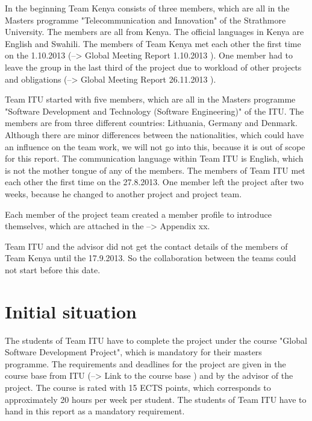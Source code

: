 In the beginning Team Kenya consists of three members, which are all in the Masters programme "Telecommunication and Innovation" of the Strathmore University. The members are all from Kenya. The official languages in Kenya are English and Swahili. The members of Team Kenya met each other the first time on the 1.10.2013 (--> Global Meeting Report 1.10.2013 ). One member had to leave the group in the last third of the project due to workload of other projects and obligations (--> Global Meeting Report 26.11.2013 ).

Team ITU started with five members, which are all in the Masters programme "Software Development and Technology (Software Engineering)" of the ITU. The members are from three different countries: Lithuania, Germany and Denmark. Although there are minor differences between the nationalities, which could have an influence on the team work, we will not go into this, because it is out of scope for this report. The communication language within Team ITU is English, which is not the mother tongue of any of the members. The members of Team ITU met each other the first time on the 27.8.2013. One member left the project after two weeks, because he changed to another project and project team.

Each member of the project team created a member profile to introduce themselves, which are attached in the --> Appendix xx.

Team ITU and the advisor did not get the contact details of the members of Team Kenya until the 17.9.2013. So the collaboration between the teams could not start before this date.


\section{Initial situation}



The students of Team ITU have to complete the project under the course "Global Software Development Project", which is mandatory for their masters programme. The requirements and deadlines for the project are given in the course base from ITU (--> Link to the course base ) and by the advisor of the project. The course is rated with 15 ECTS points, which corresponds to approximately 20 hours per week per student. The students of Team ITU have to hand in this report as a mandatory requirement.

